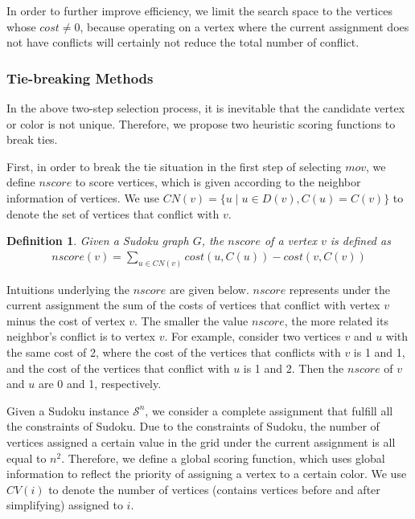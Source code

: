 \documentclass{article}
\newtheorem{Definition}{Definition}
\begin{document}
In order to further improve efficiency, we limit the search space to the vertices whose $cost \neq 0$, because operating on a vertex where the current assignment does not have conflicts will certainly not reduce the total number of conflict.

\subsubsection{Tie-breaking Methods}

In the above two-step selection process, it is inevitable that the candidate vertex or color is not unique. Therefore, we propose two heuristic scoring functions to break ties.

First, in order to break the tie situation in the first step of selecting $mov$, we define $nscore$ to score vertices, which is given according to the neighbor information of vertices. We use $CN(v) = \{u \mid u \in D(v), C(u) = C(v) \}$ to denote the set of vertices that conflict with $v$.

\begin{Definition}
Given a Sudoku graph $G$, the $nscore$ of a vertex $v$ is defined as 
\begin{align}
    nscore(v) = {\sum_{u \in CN(v)} {cost(u, C(u))}} - cost(v, C(v))
\end{align}%
\end{Definition}

Intuitions underlying the $nscore$ are given below. $nscore$ represents under the current assignment the sum of the costs of vertices that conflict with vertex $v$ minus the cost of vertex $v$. The smaller the value $nscore$, the more related its neighbor's conflict is to vertex $v$. For example, consider two vertices $v$ and $u$ with the same cost of 2, where the cost of the vertices that conflicts with $v$ is 1 and 1, and the cost of the vertices that conflict with $u$ is 1 and 2. Then the $nscore$ of $v$ and $u$ are 0 and 1, respectively. 

Given a Sudoku instance $\mathcal{S}^n$, we consider a complete assignment that fulfill all the constraints of Sudoku. Due to the constraints of Sudoku, the number of vertices assigned a certain value in the grid under the current assignment is all equal to $n^2$. Therefore, we define a global scoring function, which uses global information to reflect the priority of assigning a vertex to a certain color. We use $CV(i)$ to denote the number of vertices (contains vertices before and after simplifying) assigned to $i$.
\end{document}
